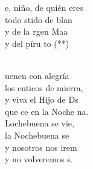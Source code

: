 \begin{cancion}%
	\begin{chorus}%
	e, niño, de quién eres\\
	todo stido de blan\\
	y de la rgen Maa\\
	y del píru to (**)\\
	\end{chorus}%
	\jump\\
	uenen con alegría\\
	los cnticos de mierra,\\
	y viva el Hijo de Ds\\
	que ce en la Noche na.\\
\jump
	Lochebuena se vie,\\
	la Nochebuena se \\
	y nosotros nos irem\\
	y no volveremos s.\\
\end{cancion}%
